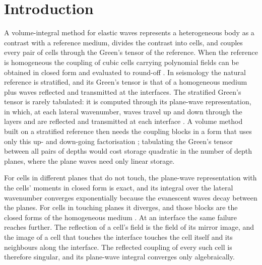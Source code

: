 \documentclass[11pt,a4paper]{article}
\begin{document}

\section{Introduction}\label{sec:intro}

A volume-integral method for elastic waves represents a heterogeneous body as a contrast with a reference
medium, divides the contrast into cells, and couples every pair of cells through the Green's tensor of the
reference. When the reference is homogeneous the coupling of cubic cells carrying polynomial fields can be
obtained in closed form and evaluated to round-off \citep{NestorCoupling2026}. In seismology the natural
reference is stratified, and its Green's tensor is that of a homogeneous medium plus waves reflected and
transmitted at the interfaces. The stratified Green's tensor is rarely tabulated: it is computed through its
plane-wave representation, in which, at each lateral wavenumber, waves travel up and down through the layers
and are reflected and transmitted at each interface \citep{FuchsMuller1971,Kennett1983}. A volume method built
on a stratified reference then needs the coupling blocks in a form that uses only this up- and down-going
factorisation \citep{Nestor1996}; tabulating the Green's tensor between all pairs of depths would cost
storage quadratic in the number of depth planes, where the plane waves need only linear storage.

For cells in different planes that do not touch, the plane-wave representation with the cells' moments in
closed form is exact, and its integral over the lateral wavenumber converges exponentially because the
evanescent waves decay between the planes. For cells in touching planes it diverges, and those blocks
are the closed forms of the homogeneous medium \citep{NestorCoupling2026}. At an interface the same failure
reaches further. The reflection of a cell's field is the field of its mirror image, and the image of a cell
that touches the interface touches the cell itself and its neighbours along the interface. The reflected
coupling of every such cell is therefore singular, and its plane-wave integral converges only
algebraically.
\end{document}
